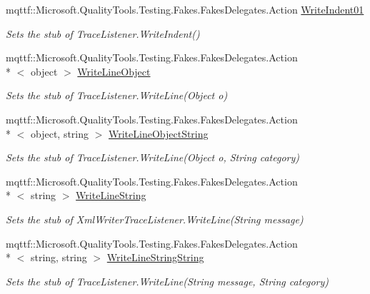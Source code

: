 \begin{DoxyCompactItemize}
mqttf\-::\-Microsoft.\-Quality\-Tools.\-Testing.\-Fakes.\-Fakes\-Delegates.\-Action \hyperlink{class_system_1_1_diagnostics_1_1_fakes_1_1_stub_xml_writer_trace_listener_a52fb3395823e88a14f832f6e152ee3cf}{Write\-Indent01}
\begin{DoxyCompactList}\small\item\em Sets the stub of Trace\-Listener.\-Write\-Indent()\end{DoxyCompactList}\item 
mqttf\-::\-Microsoft.\-Quality\-Tools.\-Testing.\-Fakes.\-Fakes\-Delegates.\-Action\\*
$<$ object $>$ \hyperlink{class_system_1_1_diagnostics_1_1_fakes_1_1_stub_xml_writer_trace_listener_a5f6b6f9ed6d7244dfa8b5d3a5a64936b}{Write\-Line\-Object}
\begin{DoxyCompactList}\small\item\em Sets the stub of Trace\-Listener.\-Write\-Line(\-Object o)\end{DoxyCompactList}\item 
mqttf\-::\-Microsoft.\-Quality\-Tools.\-Testing.\-Fakes.\-Fakes\-Delegates.\-Action\\*
$<$ object, string $>$ \hyperlink{class_system_1_1_diagnostics_1_1_fakes_1_1_stub_xml_writer_trace_listener_a4753c4bb60564f26795043341e6f80e1}{Write\-Line\-Object\-String}
\begin{DoxyCompactList}\small\item\em Sets the stub of Trace\-Listener.\-Write\-Line(\-Object o, String category)\end{DoxyCompactList}\item 
mqttf\-::\-Microsoft.\-Quality\-Tools.\-Testing.\-Fakes.\-Fakes\-Delegates.\-Action\\*
$<$ string $>$ \hyperlink{class_system_1_1_diagnostics_1_1_fakes_1_1_stub_xml_writer_trace_listener_a8c765b86d01246e18a6128ef8f4866f7}{Write\-Line\-String}
\begin{DoxyCompactList}\small\item\em Sets the stub of Xml\-Writer\-Trace\-Listener.\-Write\-Line(\-String message)\end{DoxyCompactList}\item 
mqttf\-::\-Microsoft.\-Quality\-Tools.\-Testing.\-Fakes.\-Fakes\-Delegates.\-Action\\*
$<$ string, string $>$ \hyperlink{class_system_1_1_diagnostics_1_1_fakes_1_1_stub_xml_writer_trace_listener_aa711faf2f0825a9813079f93f592c36b}{Write\-Line\-String\-String}
\begin{DoxyCompactList}\small\item\em Sets the stub of Trace\-Listener.\-Write\-Line(\-String message, String category)\end{DoxyCompactList}\item 

\end{DoxyCompactItemize}
